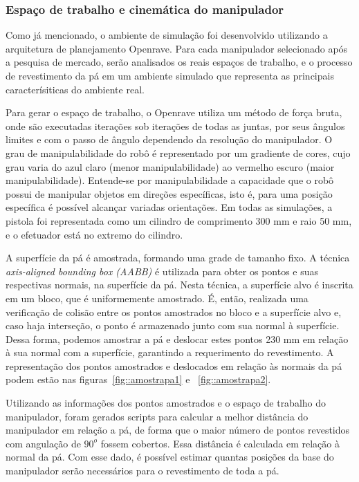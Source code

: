 \subsubsection{Espaço de trabalho e cinemática do
manipulador}\label{sec::cinematica} 

Como já mencionado, o ambiente de simulação
foi desenvolvido utilizando a arquitetura de planejamento Openrave. Para cada manipulador selecionado após a
pesquisa de mercado, serão analisados os reais espaços de trabalho, e o processo de
revestimento da pá em um ambiente simulado que representa as principais
caracterísiticas do ambiente real.

Para gerar o espaço de trabalho, o Openrave utiliza um método de força bruta,
onde são executadas iterações sob iterações de todas as juntas, por seus ângulos
limites e com o passo de ângulo dependendo da resolução do manipulador. O grau
de manipulabilidade do robô é representado por um gradiente de cores, cujo grau
varia do azul claro (menor manipulabilidade) ao vermelho escuro (maior manipulabilidade).
Entende-se por manipulabilidade a capacidade que o robô possui de manipular
objetos em direções específicas, isto é, para uma posição específica é
possível alcançar variadas orientações. Em todas as simulações, a pistola foi
representada como um cilindro de comprimento 300 mm e raio 50 mm, e o efetuador está no extremo do cilindro.

A superfície da pá é amostrada, formando uma grade de tamanho fixo. A técnica
\textit{axis-aligned bounding box (AABB)} é utilizada para obter os
pontos e suas respectivas normais, na superfície da pá. Nesta técnica, a
superfície alvo é inscrita em um bloco, que é uniformemente amostrado. É, então,
realizada uma verificação de colisão entre os pontos amostrados no bloco e a
superfície alvo e, caso haja interseção, o ponto é armazenado junto com sua
normal à superfície. Dessa forma, podemos amostrar a pá e deslocar estes pontos
230 mm em relação à sua normal com a superfície, garantindo a requerimento do
revestimento. A representação dos pontos amostrados e deslocados em relação às
normais da pá podem estão nas figuras~\ref{fig::amostrapa1} e ~\ref{fig::amostrapa2}. 

Utilizando as informações dos pontos amostrados e o espaço de trabalho do
manipulador, foram gerados scripts para calcular a
melhor distância do manipulador em relação a pá, de forma que o maior número de
pontos revestidos com angulação de $90^o$ fossem cobertos.
Essa distância é calculada em relação à normal da pá. Com esse dado, é possível estimar quantas posições da base do
manipulador serão necessários para o revestimento de toda a pá.

